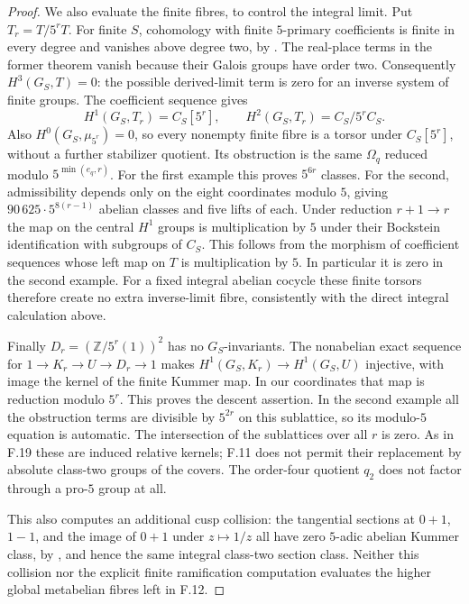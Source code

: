 \begin{proof}
We also evaluate the finite fibres, to control the
integral limit. Put $T_r=T/5^rT$.
For finite $S$, cohomology with finite $5$-primary
coefficients is finite in every degree and vanishes
above degree two, by
\citet[I, Theorem~4.10(c) and Corollary~4.15]{FA_Milne2006ADT}.
The real-place terms in the former theorem vanish
because their Galois groups have order two.
Consequently
$H^3(G_S,T)=0$: the possible derived-limit term
is zero for an inverse system of finite groups.
The coefficient sequence gives
\[
 H^1(G_S,T_r)=C_S[5^r],\qquad
 H^2(G_S,T_r)=C_S/5^rC_S.
\]
Also $H^0(G_S,\mu_{5^r})=0$, so every nonempty
finite fibre is a torsor under $C_S[5^r]$, without
a further stabilizer quotient. Its obstruction is
the same $\Omega_q$ reduced modulo
$5^{\min(e_q,r)}$.
For the first example this proves $5^{6r}$ classes.
For the second, admissibility depends only on
the eight coordinates modulo $5$, giving
$90\,625\cdot5^{8(r-1)}$ abelian classes and
five lifts of each. Under reduction $r+1\to r$
the map on the central $H^1$ groups is multiplication
by $5$ under their Bockstein identification with
subgroups of $C_S$. This follows from the morphism
of coefficient sequences whose left map on $T$
is multiplication by $5$. In particular it is
zero in the second example. For a fixed integral
abelian cocycle these finite torsors therefore
create no extra inverse-limit fibre, consistently
with the direct integral calculation above.

Finally $D_r=(\mathbb Z/5^r(1))^2$ has no
$G_S$-invariants. The nonabelian exact sequence
for $1\to K_r\to U\to D_r\to1$ makes
$H^1(G_S,K_r)\to H^1(G_S,U)$ injective, with
image the kernel of the finite Kummer map.
In our coordinates that map is reduction modulo
$5^r$. This proves the descent assertion. In
the second example all the obstruction terms
are divisible by $5^{2r}$ on this sublattice,
so its modulo-$5$ equation is automatic.
The intersection of the sublattices over all
$r$ is zero. As in F.19 these are induced
relative kernels; F.11 does not permit their
replacement by absolute class-two groups of
the covers. The order-four quotient $q_2$
does not factor through a pro-$5$ group at all.

This also computes an additional cusp collision:
the tangential sections at $0+1$, $1-1$, and
the image of $0+1$ under $z\mapsto1/z$ all have
zero $5$-adic abelian Kummer class, by
\citet[Lemma~3.16]{FA_Wickelgren2012}, and hence
the same integral class-two section class.
Neither this collision nor the explicit finite
ramification computation evaluates the higher
global metabelian fibres left in F.12.
\end{proof}

